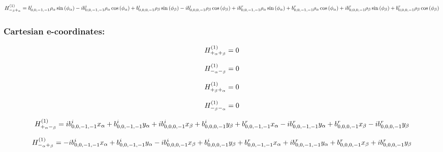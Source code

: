 \documentclass[fleqn]{article}
\begin{document}
\begin{dmath*}
H_{-_{\beta}+_{\alpha}}^{(1)}=b^{i}_{0,0,-1,-1} \rho_{\alpha} \sin{\left (\phi_{\alpha} \right )} -  i b^{i}_{0,0,-1,-1} \rho_{\alpha} \cos{\left (\phi_{\alpha} \right )} + b^{i}_{0,0,0,-1} \rho_{\beta} \sin{\left (\phi_{\beta} \right )} -  i b^{i}_{0,0,0,-1} \rho_{\beta} \cos{\left (\phi_{\beta} \right )} +  i b^{r}_{0,0,-1,-1} \rho_{\alpha} \sin{\left (\phi_{\alpha} \right )} + b^{r}_{0,0,-1,-1} \rho_{\alpha} \cos{\left (\phi_{\alpha} \right )} +  i b^{r}_{0,0,0,-1} \rho_{\beta} \sin{\left (\phi_{\beta} \right )} + b^{r}_{0,0,0,-1} \rho_{\beta} \cos{\left (\phi_{\beta} \right )}\\
\end{dmath*}
\subsubsection*{Cartesian e-coordinates:}

\begin{dmath*}
H_{+_{\alpha}+_{\beta}}^{(1)}=0\\
\end{dmath*}

\begin{dmath*}
H_{-_{\alpha}-_{\beta}}^{(1)}=0\\
\end{dmath*}

\begin{dmath*}
H_{+_{\beta}+_{\alpha}}^{(1)}=0\\
\end{dmath*}

\begin{dmath*}
H_{-_{\beta}-_{\alpha}}^{(1)}=0\\
\end{dmath*}

\begin{dmath*}
H_{+_{\alpha}-_{\beta}}^{(1)}= i b^{i}_{0,0,-1,-1} x_{\alpha} + b^{i}_{0,0,-1,-1} y_{\alpha} +  i b^{i}_{0,0,0,-1} x_{\beta} + b^{i}_{0,0,0,-1} y_{\beta} + b^{r}_{0,0,-1,-1} x_{\alpha} -  i b^{r}_{0,0,-1,-1} y_{\alpha} + b^{r}_{0,0,0,-1} x_{\beta} -  i b^{r}_{0,0,0,-1} y_{\beta}\\
\end{dmath*}

\begin{dmath*}
H_{-_{\alpha}+_{\beta}}^{(1)}=-  i b^{i}_{0,0,-1,-1} x_{\alpha} + b^{i}_{0,0,-1,-1} y_{\alpha} -  i b^{i}_{0,0,0,-1} x_{\beta} + b^{i}_{0,0,0,-1} y_{\beta} + b^{r}_{0,0,-1,-1} x_{\alpha} +  i b^{r}_{0,0,-1,-1} y_{\alpha} + b^{r}_{0,0,0,-1} x_{\beta} +  i b^{r}_{0,0,0,-1} y_{\beta}\\
\end{dmath*}
\end{document}

